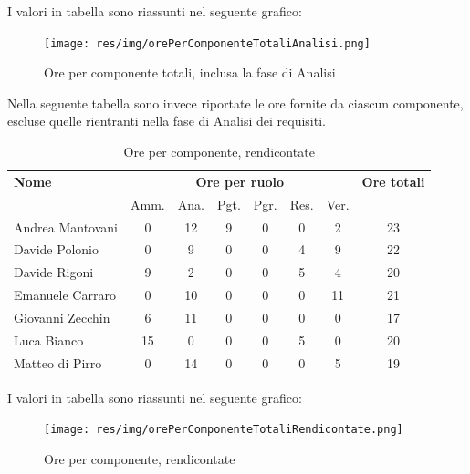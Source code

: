 I valori in tabella sono riassunti nel seguente grafico: \\ 

    \begin{figure}[H]
      \begin{center}
        \texttt{[image: res/img/orePerComponenteTotaliAnalisi.png]}
      \caption{Ore per componente totali, inclusa la fase di Analisi}
      \end{center} 
    \end{figure}    
    
Nella seguente tabella sono invece riportate le ore fornite da ciascun componente, escluse quelle rientranti nella fase di Analisi dei requisiti.

    \begin{table}[H]
    \begin{tabular}{lccccccc}
    \toprule
        \textbf{Nome}  & \multicolumn{6}{c}{\textbf{Ore per ruolo}} & \textbf{Ore totali} \\
         & Amm. & Ana. & Pgt. & Pgr. & Res. & Ver. & \\
        \midrule
        
    	Andrea Mantovani & 0 & 12 & 9 & 0 & 0 & 2 & 23 \\
    	Davide Polonio & 0 & 9 & 0 & 0 & 4 & 9 & 22 \\
    	Davide Rigoni & 9 & 2 & 0 & 0 & 5 & 4 & 20 \\
    	Emanuele Carraro & 0 & 10 & 0 & 0 & 0 & 11 & 21 \\
    	Giovanni Zecchin & 6 & 11 & 0 & 0 & 0 & 0 & 17 \\
    	Luca Bianco & 15 & 0 & 0 & 0 & 5 & 0 & 20 \\
    	Matteo di Pirro & 0 & 14 & 0 & 0 & 0 & 5 & 19 \\
        
        \bottomrule
    \end{tabular}
    \caption{Ore per componente, rendicontate}
    \end{table}
    
    I valori in tabella sono riassunti nel seguente grafico: \\ 
    
        \begin{figure}[H]
          \begin{center}
            \texttt{[image: res/img/orePerComponenteTotaliRendicontate.png]}
          \caption{Ore per componente, rendicontate}
          \end{center} 
        \end{figure}   
    
